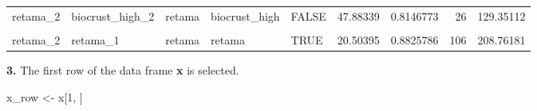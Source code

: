 \documentclass[]{article}
\newenvironment{Shaded}{\begin{snugshade}}{\end{snugshade}}
\newcommand{\DecValTok}[1]{\textcolor[rgb]{0.00,0.00,0.81}{#1}}
\newcommand{\NormalTok}[1]{#1}
\newcommand{\StringTok}[1]{\textcolor[rgb]{0.31,0.60,0.02}{#1}}
\begin{document}
\begin{table}[H]
{\begin{tabular}[t]{l|l|l|l|l|r|r|r|r}
\hline
\cellcolor{gray!6}{retama\_2} & \cellcolor{gray!6}{biocrust\_high\_1} & \cellcolor{gray!6}{retama} & \cellcolor{gray!6}{biocrust\_high} & \cellcolor{gray!6}{FALSE} & \cellcolor{gray!6}{47.95649} & \cellcolor{gray!6}{0.6954543} & \cellcolor{gray!6}{25} & \cellcolor{gray!6}{117.50191}\\
\hline
retama\_2 & biocrust\_high\_2 & retama & biocrust\_high & FALSE & 47.88339 & 0.8146773 & 26 & 129.35112\\
\hline
\cellcolor{gray!6}{retama\_2} & \cellcolor{gray!6}{biocrust\_high\_3} & \cellcolor{gray!6}{retama} & \cellcolor{gray!6}{biocrust\_high} & \cellcolor{gray!6}{FALSE} & \cellcolor{gray!6}{33.64221} & \cellcolor{gray!6}{0.8001904} & \cellcolor{gray!6}{27} & \cellcolor{gray!6}{113.66124}\\
\hline
retama\_2 & retama\_1 & retama & retama & TRUE & 20.50395 & 0.8825786 & 106 & 208.76181\\
\hline
\end{tabular}}
\end{table}

\textbf{3.} The first row of the data frame \textbf{x} is selected.

\begin{Shaded}
\begin{Highlighting}[]
\NormalTok{x_row <-}\StringTok{ }\NormalTok{x[}\DecValTok{1}\NormalTok{, ]}
\end{Highlighting}
\end{Shaded}

\begin{table}[H]
\centering
{}
\end{table}
\end{document}
